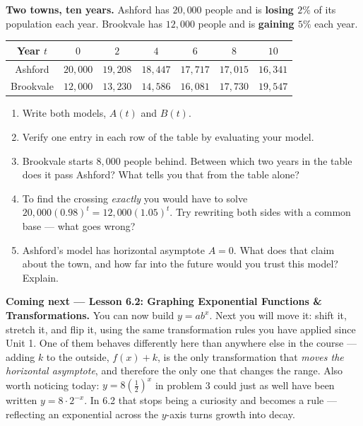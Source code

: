 \documentclass[10pt]{article}
\begin{document}
\begin{extensionbox}
\textbf{Two towns, ten years.} Ashford has $20{,}000$ people and is \textbf{losing $2\%$} of its
population each year. Brookvale has $12{,}000$ people and is \textbf{gaining $5\%$} each year.
\begin{center}
\renewcommand{\arraystretch}{1.25}
\begin{tabular}{|c|c|c|c|c|c|c|}
\hline
Year $t$ & $0$ & $2$ & $4$ & $6$ & $8$ & $10$ \\ \hline
Ashford & $20{,}000$ & $19{,}208$ & $18{,}447$ & $17{,}717$ & $17{,}015$ & $16{,}341$ \\ \hline
Brookvale & $12{,}000$ & $13{,}230$ & $14{,}586$ & $16{,}081$ & $17{,}730$ & $19{,}547$ \\ \hline
\end{tabular}
\end{center}
\begin{enumerate}[label=(\alph*), leftmargin=1.8em, itemsep=5pt]
  \item Write both models, $A(t)$ and $B(t)$.
  \item Verify one entry in each row of the table by evaluating your model.
  \item Brookvale starts $8{,}000$ people behind. Between which two years in the table does it pass
        Ashford? What tells you that from the table alone?
  \item To find the crossing \emph{exactly} you would have to solve
        $20{,}000(0.98)^{t} = 12{,}000(1.05)^{t}$. Try rewriting both sides with a common base ---
        what goes wrong?
  \item Ashford's model has horizontal asymptote $A=0$. What does that claim about the town, and how
        far into the future would you trust this model? Explain.
\end{enumerate}
\end{extensionbox}

\begin{spiralbox}
\textbf{Coming next --- Lesson 6.2: Graphing Exponential Functions \& Transformations.} You can now
build $y=ab^{x}$. Next you will move it: shift it, stretch it, and flip it, using the same
transformation rules you have applied since Unit 1. One of them behaves differently here than
anywhere else in the course --- adding $k$ to the outside, $f(x)+k$, is the only transformation that
\emph{moves the horizontal asymptote}, and therefore the only one that changes the range. Also worth
noticing today: $y=8\left(\frac12\right)^{x}$ in problem 3 could just as well have been written
$y=8\cdot 2^{-x}$. In 6.2 that stops being a curiosity and becomes a rule --- reflecting an
exponential across the $y$-axis turns growth into decay.
\end{spiralbox}
\end{document}
